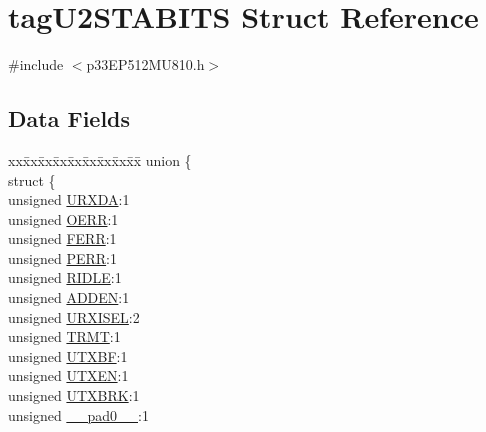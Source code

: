 \hypertarget{structtag_u2_s_t_a_b_i_t_s}{}\section{tag\+U2\+S\+T\+A\+B\+I\+TS Struct Reference}
\label{structtag_u2_s_t_a_b_i_t_s}


{\ttfamily \#include $<$p33\+E\+P512\+M\+U810.\+h$>$}

\subsection*{Data Fields}
\begin{DoxyCompactItemize}
\item 
\begin{tabbing}
xx\=xx\=xx\=xx\=xx\=xx\=xx\=xx\=xx\=\kill
union \{\\
\>struct \{\\
\>\>unsigned \hyperlink{structtag_u2_s_t_a_b_i_t_s_afe0995f70524f97d3bbf5a19da8be125}{URXDA}:1\\
\>\>unsigned \hyperlink{structtag_u2_s_t_a_b_i_t_s_a51850c0a0e36c88695788d8258825fb1}{OERR}:1\\
\>\>unsigned \hyperlink{structtag_u2_s_t_a_b_i_t_s_a6e9c49ea6356906ea25431c922eb7c71}{FERR}:1\\
\>\>unsigned \hyperlink{structtag_u2_s_t_a_b_i_t_s_a5223bc48d63e95d58e42b4cdd2edbf26}{PERR}:1\\
\>\>unsigned \hyperlink{structtag_u2_s_t_a_b_i_t_s_a8016ed1f9d9355d999bd0b5acfce06da}{RIDLE}:1\\
\>\>unsigned \hyperlink{structtag_u2_s_t_a_b_i_t_s_aa4d6c69beac6d542ad6bc014875fdff2}{ADDEN}:1\\
\>\>unsigned \hyperlink{structtag_u2_s_t_a_b_i_t_s_a8d6af72bfcd1f23f63ace4f6e89dfcdf}{URXISEL}:2\\
\>\>unsigned \hyperlink{structtag_u2_s_t_a_b_i_t_s_a63ff36fd0aa1645fb63d427eb941f177}{TRMT}:1\\
\>\>unsigned \hyperlink{structtag_u2_s_t_a_b_i_t_s_ae6f14589464b1e04ff7734553772427e}{UTXBF}:1\\
\>\>unsigned \hyperlink{structtag_u2_s_t_a_b_i_t_s_aa6ca11f821bfebd67e7001d212fbceea}{UTXEN}:1\\
\>\>unsigned \hyperlink{structtag_u2_s_t_a_b_i_t_s_a5e99a7959107d3aa21958bad8ee4bc6e}{UTXBRK}:1\\
\>\>unsigned \hyperlink{structtag_u2_s_t_a_b_i_t_s_adf71f3d8410c1f1dbbc96680a92c49af}{\_\_pad0\_\_}:1\\

\end{tabbing}
\end{DoxyCompactItemize}
